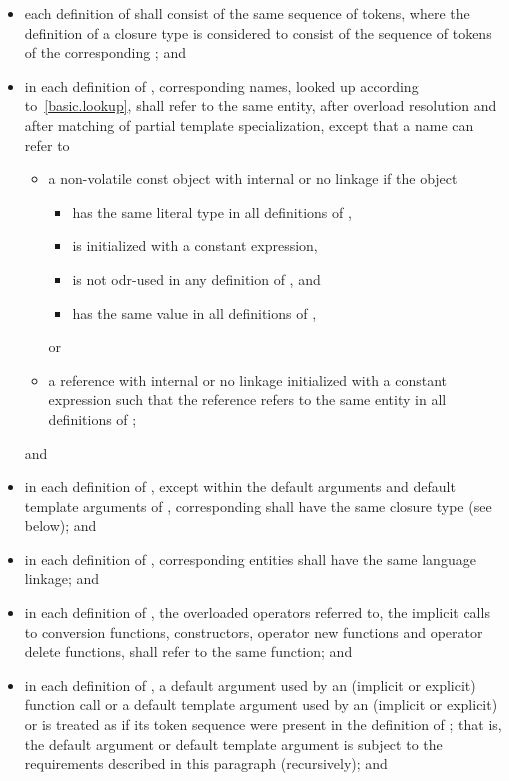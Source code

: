 \begin{itemize}
\item each definition of  shall consist of
the same sequence of tokens,
where the definition of a closure type
is considered to consist of the sequence of tokens of
the corresponding ; and
\item in each definition of , corresponding names, looked up
according to~\ref{basic.lookup}, shall refer to the same entity, after
overload resolution and after matching of partial
template specialization, except that a name can refer to
\begin{itemize}
\item
a non-volatile const object with internal or no linkage if the object
\begin{itemize}
\item has the same literal type in all definitions of ,
\item is initialized with a constant expression,
\item is not odr-used in any definition of , and
\item has the same value in all definitions of ,
\end{itemize}
or
\item
a reference with internal or no linkage
initialized with a constant expression such that
the reference refers to the same entity in all definitions of ;
\end{itemize}
and

\item in each definition of , except within
the default arguments and default template arguments of ,
corresponding  shall have
the same closure type (see below); and

\item in each definition of , corresponding entities shall have the
same language linkage; and

\item in each definition of , the overloaded operators referred
to, the implicit calls to conversion functions, constructors, operator
new functions and operator delete functions, shall refer to the same
function; and

\item in each definition of ,
a default argument used by an (implicit or explicit) function call or
a default template argument used by an (implicit or explicit)
 or 
is treated as if its token sequence
were present in the definition of ;
that is, the default argument or default template argument
is subject to the requirements described in this paragraph (recursively); and


\end{itemize}
